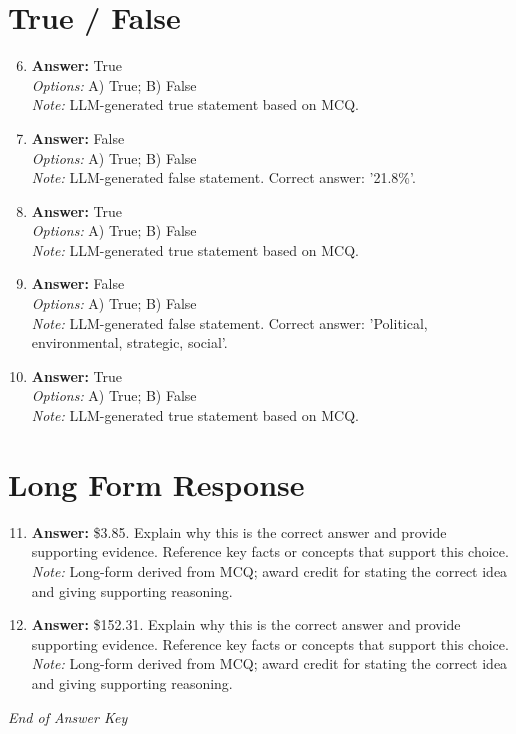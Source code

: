 \documentclass[12pt]{article}
\begin{document}
\section*{True / False}
\begin{enumerate}[label=\arabic*.]
\setcounter{enumi}{5}
\item \textbf{Answer:} True
\\ \textit{Options:} A) True; B) False
\\ \textit{Note:} LLM-generated true statement based on MCQ.
\item \textbf{Answer:} False
\\ \textit{Options:} A) True; B) False
\\ \textit{Note:} LLM-generated false statement. Correct answer: '21.8\%'.
\item \textbf{Answer:} True
\\ \textit{Options:} A) True; B) False
\\ \textit{Note:} LLM-generated true statement based on MCQ.
\item \textbf{Answer:} False
\\ \textit{Options:} A) True; B) False
\\ \textit{Note:} LLM-generated false statement. Correct answer: 'Political, environmental, strategic, social'.
\item \textbf{Answer:} True
\\ \textit{Options:} A) True; B) False
\\ \textit{Note:} LLM-generated true statement based on MCQ.
\end{enumerate}

\section*{Long Form Response}
\begin{enumerate}[label=\arabic*.]
\setcounter{enumi}{10}
\item \textbf{Answer:} \$3.85. Explain why this is the correct answer and provide supporting evidence. Reference key facts or concepts that support this choice.
\\ \textit{Note:} Long-form derived from MCQ; award credit for stating the correct idea and giving supporting reasoning.
\item \textbf{Answer:} \$152.31. Explain why this is the correct answer and provide supporting evidence. Reference key facts or concepts that support this choice.
\\ \textit{Note:} Long-form derived from MCQ; award credit for stating the correct idea and giving supporting reasoning.
\end{enumerate}

\vfill
\noindent\textit{End of Answer Key}
\end{document}
